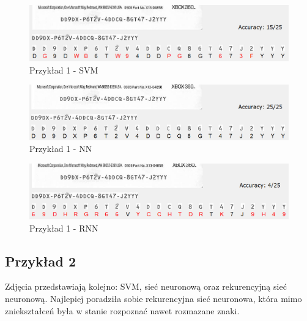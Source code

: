 \documentclass[titlepage,10pt,a4paper]{article}
\begin{document}
{\begin{figure}[!htbp]
		\centering
		\caption{Przykład 1 - SVM}
		\vspace{1cm}
		\hspace*{-2.8cm}
		\includegraphics[scale=0.52]{sample1_svm.png}
	\end{figure}
{\begin{figure}[!htbp]
	\centering
		\caption{Przykład 1 - NN}
	\vspace{1cm}
	\hspace*{-2.8cm}
	\includegraphics[scale=0.52]{sample1_nn.png}
\end{figure}
}
{\begin{figure}[!htbp]
		\centering
		\caption{Przykład 1 - RNN}
		\vspace{1cm}
		\hspace*{-2.8cm}
		\includegraphics[scale=0.52]{sample1_rnn.png}
	\end{figure}

\pagebreak


\subsection{Przykład 2}
Zdjęcia przedstawiają kolejno: SVM, sieć neuronową oraz rekurencyjną sieć neuronową. Najlepiej poradziła sobie rekurencyjna sieć neuronowa, która mimo zniekształceń była w stanie rozpoznać nawet rozmazane znaki.


}}
\end{document}
